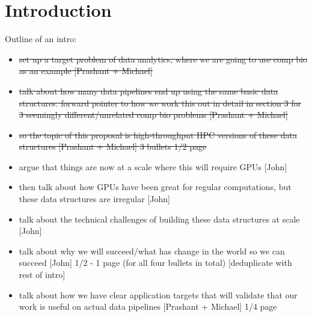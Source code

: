 


\section{Introduction}
\label{intro}




{\color{blue} Outline of an intro:
\begin{itemize}
    \item \sout{set up a target problem of data analytics, where we are going to use comp bio as an example [Prashant + Michael]}
    \item \sout{talk about how many data pipelines end up using the same basic data structures.  forward pointer to how we work this out in detail in section 3 for 3 seemingly different/unrelated comp bio problems [Prashant + Michael]}
    \item \sout{so the topic of this proposal is high-throughput HPC versions of these data structures [Prashant + Michael] 3 bullets 1/2 page}
    \item argue that things are now at a scale where this will require GPUs [John]
    \item then talk about how GPUs have been great for regular computations, but these data structures are irregular [John]
    \item talk about the technical challenges of building these data structures at scale [John]
    \item talk about why we will succeed/what has change in the world so we can succeed [John] 1/2 - 1 page (for all four bullets in total) [deduplicate with rest of intro]
    \item talk about how we have clear application targets that will validate that our work is useful on actual data pipelines [Prashant + Michael] 1/4 page
\end{itemize}
}


